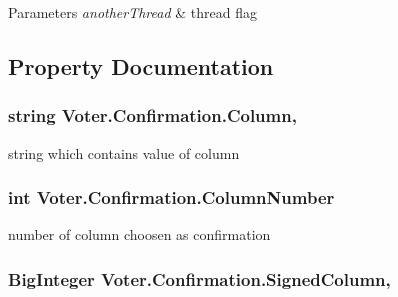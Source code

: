 \begin{DoxyParams}{Parameters}
{\em another\+Thread} & thread flag\\
\hline
\end{DoxyParams}


\subsection{Property Documentation}
\hypertarget{class_voter_1_1_confirmation_abe9dfc22916b02e6d3d263453a258118}{}
\subsubsection[{Column}]{\setlength{\rightskip}{0pt plus 5cm}string Voter.\+Confirmation.\+Column\hspace{0.3cm}{\ttfamily [get]}, {\ttfamily [set]}}\label{class_voter_1_1_confirmation_abe9dfc22916b02e6d3d263453a258118}


string which contains value of column 

\hypertarget{class_voter_1_1_confirmation_aae3d033c7c9779957eef32349c3eab1b}{}
\subsubsection[{Column\+Number}]{\setlength{\rightskip}{0pt plus 5cm}int Voter.\+Confirmation.\+Column\+Number\hspace{0.3cm}{\ttfamily [set]}}\label{class_voter_1_1_confirmation_aae3d033c7c9779957eef32349c3eab1b}


number of column choosen as confirmation 

\hypertarget{class_voter_1_1_confirmation_adcda91422874933f5faf189461e44ee8}{}
\subsubsection[{Signed\+Column}]{\setlength{\rightskip}{0pt plus 5cm}Big\+Integer Voter.\+Confirmation.\+Signed\+Column\hspace{0.3cm}{\ttfamily [get]}, {\ttfamily [set]}}\label{class_voter_1_1_confirmation_adcda91422874933f5faf189461e44ee8}



